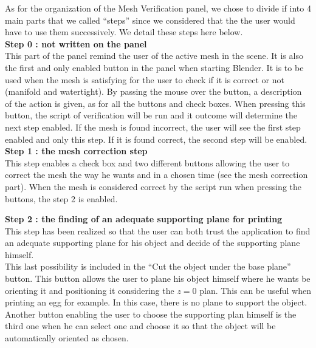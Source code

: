 \documentclass{report}
\begin{document}
As for the organization of the Mesh Verification panel, we chose to divide if into 4 main parts that we called ``steps'' since we considered that the the user would have to use them successively. We detail these steps here below.\\

\textbf{Step 0 : not written on the panel} \\

This part of the panel remind the user of the active mesh in the scene. It is also the first and only enabled button in the panel when starting Blender. It is to be used when the mesh is satisfying for the user to check if it is correct or not (manifold and watertight). By passing the mouse over the button, a description of the action is given, as for all the buttons and check boxes. When pressing this button, the script of verification will be run and it outcome will determine the next step enabled. If the mesh is found incorrect, the user will see the first step enabled and only this step. If it is found correct, the second step will be enabled.\\

\textbf{Step 1 : the mesh correction step} \\

This step enables a check box and two different buttons allowing the user to correct the mesh the way he wants and in a chosen time (see the mesh correction part). When the mesh is considered correct by the script run when pressing the buttons, the step 2 is enabled.

\textbf{Step 2 : the finding of an adequate supporting plane for printing}\\

This step has been realized so that the user can both trust the application to find an adequate supporting plane for his object and decide of the supporting plane himself. \\

This last possibility is included in the ``Cut the object under the base plane'' button. This button allows the user to plane his object himself where he wants be orienting it and positioning it considering the $z = 0$ plan. This can be useful when printing an egg for example. In this case, there is no plane to support the object. Another button enabling the user to choose the supporting plan himself is the third one when he can select one and choose it so that the object will be automatically oriented as chosen.\\
\end{document}
